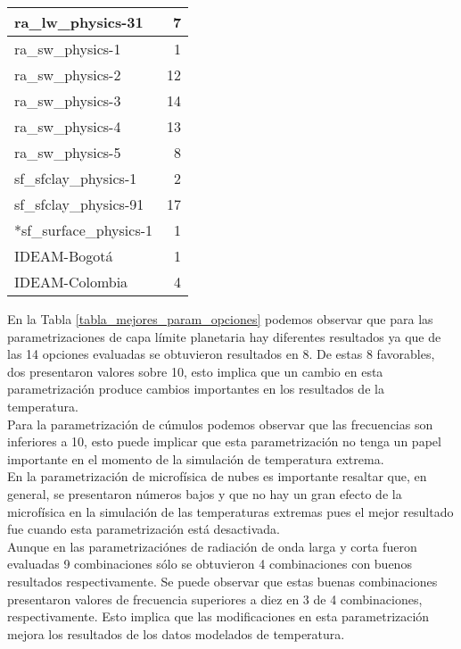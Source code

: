 \begin{itemize}
\begin{table}[H]
\begin{tabular}{lr}
ra\_lw\_physics-31     &      7 \\ \hline
ra\_sw\_physics-1      &      1 \\
ra\_sw\_physics-2      &     12 \\
ra\_sw\_physics-3      &     14 \\
ra\_sw\_physics-4      &     13 \\
ra\_sw\_physics-5      &      8 \\ \hline
sf\_sfclay\_physics-1  &      2 \\
sf\_sfclay\_physics-91 &     17 \\ \hline
*sf\_surface\_physics-1 &      1 \\
IDEAM-Bogotá         &      1 \\
IDEAM-Colombia       &      4 \\
\bottomrule
\end{tabular}
\end{table}

En la Tabla \ref{tabla_mejores_param_opciones} podemos observar que para las parametrizaciones de capa límite planetaria hay diferentes resultados ya que de las 14 opciones evaluadas se obtuvieron resultados en 8. De estas 8 favorables, dos presentaron valores sobre 10, esto implica que un cambio en esta parametrización produce cambios importantes en los resultados de la temperatura.\\ 

Para la parametrización de cúmulos podemos observar que las frecuencias son inferiores a 10, esto puede implicar que esta parametrización no tenga un papel importante en el momento de la simulación de temperatura extrema.\\

En la parametrización de microfísica de nubes es importante resaltar que, en general, se presentaron números bajos y que no hay un gran efecto de la microfísica en la simulación de las temperaturas extremas pues el mejor resultado fue cuando esta parametrización está desactivada.\\

Aunque en las parametrizaciónes de radiación de onda larga y corta fueron evaluadas 9 combinaciones sólo se obtuvieron 4 combinaciones con buenos resultados respectivamente. Se puede observar que estas buenas combinaciones presentaron valores de frecuencia superiores a diez en 3 de 4 combinaciones, respectivamente. Esto implica que las modificaciones en esta parametrización mejora los resultados de los datos modelados de temperatura.\\



\end{itemize}

